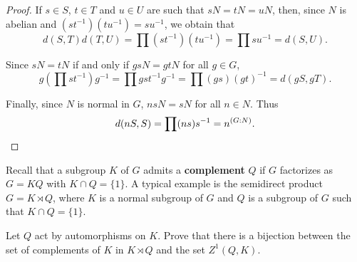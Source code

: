 \begin{proof}
	If $s\in S$, $t\in T$ and $u\in U$ are such that $sN=tN=uN$, then, since $N$ is 
	abelian and $(st^{-1})(tu^{-1})=su^{-1}$, we obtain that 
	\[
		d(S,T)d(T,U)=\prod (st^{-1})(tu^{-1})=\prod su^{-1}=d(S,U).
	\]

	Since $sN=tN$ if and only if $gsN=gtN$ for all $g\in G$, 
	\[
	g\left(\prod st^{-1}\right)g^{-1}=\prod gst^{-1}g^{-1}=\prod (gs)(gt)^{-1}=d(gS,gT).
	\]

	Finally, since $N$ is normal in $G$, $nsN=sN$ for all $n\in N$. Thus 
	\[
		d(nS,S)=\prod (ns)s^{-1}=n^{(G:N)}.\qedhere
	\]
\end{proof}

Recall that a subgroup $K$ of $G$ admits a \textbf{complement} $Q$ 
if $G$ factorizes as 
$G=KQ$ with $K\cap Q=\{1\}$. 
A typical example is the semidirect product $G=K\rtimes Q$, where $K$ is a normal subgroup of 
$G$ and $Q$ is a subgroup of $G$ such that $K\cap Q=\{1\}$. 

\begin{exercise}
\label{xca:complementos}
Let $Q$ act by automorphisms on $K$. Prove that there is a bijection 
between the set of complements of $K$ in $K\rtimes Q$ and the set 
$Z^1(Q,K)$.
\end{exercise}

	
	

